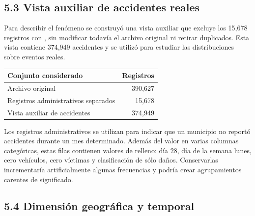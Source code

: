 \documentclass[11pt,letterpaper]{article}
\begin{document}
\subsection*{5.3 Vista auxiliar de accidentes reales}

\begin{nota}
Para describir el fenómeno se construyó una vista auxiliar que excluye los
15,678 registros con , sin modificar todavía el
archivo original ni retirar duplicados. Esta vista contiene 374,949 accidentes y
se utilizó para estudiar las distribuciones sobre eventos reales.

\vspace{0.4em}
\begin{tabularx}{0.8\textwidth}{Yr}
    \toprule
    \textbf{Conjunto considerado} & \textbf{Registros} \\
    \midrule
    Archivo original & 390,627 \\
    Registros administrativos separados & 15,678 \\
    Vista auxiliar de accidentes & 374,949 \\
    \bottomrule
\end{tabularx}

\vspace{0.4em}
Los registros administrativos se utilizan para indicar que un municipio no
reportó accidentes durante un mes determinado. Además del valor
 en varias columnas categóricas, estas filas contienen
valores de relleno: día 28, día de la semana lunes, cero vehículos, cero víctimas
y clasificación de sólo daños. Conservarlas incrementaría artificialmente
algunas frecuencias y podría crear agrupamientos carentes de significado.
\end{nota}

\subsection*{5.4 Dimensión geográfica y temporal}
\end{document}
